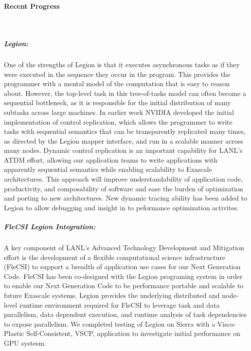 \paragraph{Recent Progress} \leavevmode \\

\subparagraph{Legion:} 
One of the strengths of Legion is that it executes asynchronous tasks as if they were executed in the sequence they occur in the program. This provides the programmer with a mental model of the computation that is easy to reason about. However, the top-level task in this tree-of-tasks model can often become a sequential bottleneck, as it is responsible for the initial distribution of many subtasks across large machines. In earlier work NVIDIA developed the initial implementation of control replication, which allows the programmer to write tasks with sequential semantics that can be  transparently replicated many times, as directed by the Legion mapper interface, and run in a scalable manner across many nodes.
Dynamic control replication is an important capability for LANL's ATDM effort, allowing our application teams to write applications with apparently sequential semantics while enabling scalability to Exascale architectures. This approach will improve understandability of application code, productivity, and composability of software and ease the burden of optimization and porting to new architectures. 
New dynamic tracing ability has been added to Legion to allow debugging and insight in to peformance optimization activites.

\subparagraph{FleCSI Legion Integration:} 
A key component of LANL's Advanced Technology  Development and Mitigation effort is the development of a flexible computational science infrastructure (FleCSI) to support a breadth of application use cases for our Next Generation Code. FleCSI has been co-designed with the Legion programing system in order to enable our Next Generation Code to be performance portable and scalable to future Exascale systems. Legion provides the underlying distributed and node-level runtime environment required for FleCSI to leverage task and data parallelism, data dependent execution, and runtime analysis of task dependencies to expose parallelism. We completed testing of Legion on Sierra with a Visco-Plastic Self-Consistent, VSCP, application to investigate initial performance on GPU systesm.

